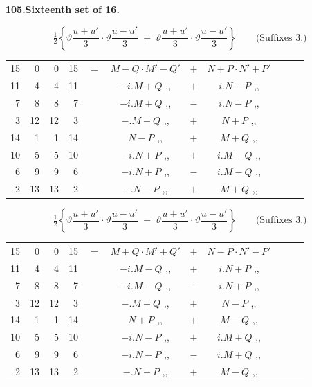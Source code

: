 \documentclass[11pt]{article}
\newcommand{\half}{\tfrac{1}{2}}
\begin{document}
\medskip
\begin{center}\textbf{105.\quad Sixteenth set of 16.}\end{center}

\[
\half\!\left\{\vartheta\frac{u+u'}{3}\cdot\vartheta\frac{u-u'}{3}\;+\;\vartheta\frac{u+u'}{3}\cdot\vartheta\frac{u-u'}{3}\right\}\qquad\text{(Suffixes 3.)}
\]
{\small
\begin{center}
\begin{tabular}{rrrrr@{\ }c@{\ }lcr@{\ }c@{\ }l}
15 & 0  & 0  & 15 & $=$ & $M-Q\cdot M'-Q'$ & $+$ & $N+P\cdot N'+P'$ \\
11 & 4  & 4  & 11 & & $-i.M+Q$ \quad ,, & $+$ & $i.N-P$ \quad ,, \\
7  & 8  & 8  & 7  & & $-i.M+Q$ \quad ,, & $-$ & $i.N-P$ \quad ,, \\
3  & 12 & 12 & 3  & & $-.M-Q$ \quad ,, & $+$ & $N+P$ \quad ,, \\
14 & 1  & 1  & 14 & & $N-P$ \quad ,, & $+$ & $M+Q$ \quad ,, \\
10 & 5  & 5  & 10 & & $-i.N+P$ \quad ,, & $+$ & $i.M-Q$ \quad ,, \\
6  & 9  & 9  & 6  & & $-i.N+P$ \quad ,, & $-$ & $i.M-Q$ \quad ,, \\
2  & 13 & 13 & 2  & & $-.N-P$ \quad ,, & $+$ & $M+Q$ \quad ,, \\
\end{tabular}
\end{center}
}

\[
\half\!\left\{\vartheta\frac{u+u'}{3}\cdot\vartheta\frac{u-u'}{3}\;-\;\vartheta\frac{u+u'}{3}\cdot\vartheta\frac{u-u'}{3}\right\}\qquad\text{(Suffixes 3.)}
\]
{\small
\begin{center}
\begin{tabular}{rrrrr@{\ }c@{\ }lcr@{\ }c@{\ }l}
15 & 0  & 0  & 15 & $=$ & $M+Q\cdot M'+Q'$ & $+$ & $N-P\cdot N'-P'$ \\
11 & 4  & 4  & 11 & & $-i.M-Q$ \quad ,, & $+$ & $i.N+P$ \quad ,, \\
7  & 8  & 8  & 7  & & $-i.M-Q$ \quad ,, & $-$ & $i.N+P$ \quad ,, \\
3  & 12 & 12 & 3  & & $-.M+Q$ \quad ,, & $+$ & $N-P$ \quad ,, \\
14 & 1  & 1  & 14 & & $N+P$ \quad ,, & $+$ & $M-Q$ \quad ,, \\
10 & 5  & 5  & 10 & & $-i.N-P$ \quad ,, & $+$ & $i.M+Q$ \quad ,, \\
6  & 9  & 9  & 6  & & $-i.N-P$ \quad ,, & $-$ & $i.M+Q$ \quad ,, \\
2  & 13 & 13 & 2  & & $-.N+P$ \quad ,, & $+$ & $M-Q$ \quad ,, \\
\end{tabular}
\end{center}
}
\end{document}
